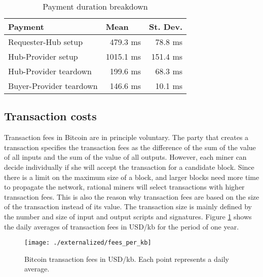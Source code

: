 \begin{table}
\centering
\caption{Payment duration breakdown}
\begin{tabular}{|l|r|r|}
\hline
{\bf Payment } & \multicolumn{1}{l|}{{\bf Mean}} & \multicolumn{1}{l|}{{\bf St. Dev.}} \\ \hline
Requester-Hub setup             & 479.3 ms                 & 78.8 ms                      \\ \hline
Hub-Provider setup            & 1015.1 ms                & 151.4 ms                     \\ \hline
Hub-Provider teardown         & 199.6 ms                 & 68.3 ms                      \\ \hline
Buyer-Provider teardown          & 146.6 ms                 & 10.1 ms                      \\ \hline
\end{tabular}

\label{tbl:performance}
\end{table} 


\subsection{Transaction costs}
\label{sec:fees}
Transaction fees in Bitcoin are in principle voluntary. The party that creates a transaction specifies the transaction fees as the difference of the sum of the value of all inputs and the sum of the value of all outputs. However, each miner can decide individually if she will accept the transaction for a candidate block. Since there is a limit on the maximum size of a block, and larger blocks need more time to propagate the network, rational miners will select transactions with higher transaction fees. This is also the reason why transaction fees are based on the size of the transaction instead of its value. The transaction size is mainly defined by the number and size of input and output scripts and signatures. Figure \ref{fig:tx_fees} shows the daily averages of transaction fees in USD/kb for the period of one year.

\begin{figure}[!t]
\centering
\texttt{[image: ./externalized/fees\_per\_kb]}
\caption{Bitcoin transaction fees in USD/kb. Each point represents a daily average.}
\label{fig:tx_fees}
\end{figure}


